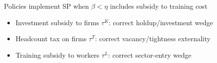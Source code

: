 \documentclass[9pt,xcolor={svgnames}]{beamer}
\begin{document}
\begin{frame}{Policies implement SP when $\beta<\eta$ includes subsidy to training cost}
\small

\begin{center}
\end{center}

\begin{itemize}
    \item Investment subsidy to firms $\tau^K$: correct holdup/investment wedge

\item Headcount tax on firms $\tau^T$: correct vacancy/tightness externality

\item Training subsidy to workers $\tau^L$: correct sector-entry wedge 
\end{itemize}

    
\end{frame}
\end{document}
